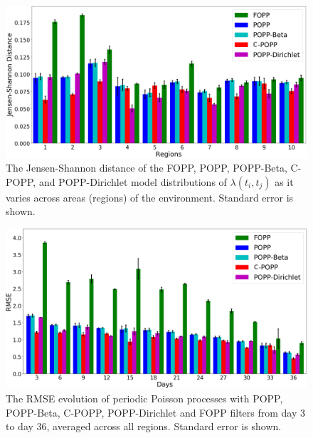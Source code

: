\begin{figure}[t!]
	\centering
	\includegraphics[width=0.95\columnwidth]{./figures/fopp_popp_popb_npop_popd_kl.png}
	\caption{The Jensen-Shannon distance of the FOPP, POPP, POPP-Beta, C-POPP, and POPP-Dirichlet model distributions of $\lambda(t_i, t_j)$ as it varies across areas (regions) of the environment. Standard error is shown.}
	\label{fig:fopp_popp_popb_npop_popd_kl}
\end{figure}

\begin{figure}[t!]
	\centering
	\includegraphics[width=0.95\columnwidth]{./figures/fopp_popp_popb_npop_popd_rmse_evo.png}
	\caption{The RMSE evolution of periodic Poisson processes with POPP, POPP-Beta, C-POPP, POPP-Dirichlet and FOPP filters from day 3 to day 36, averaged across all regions. Standard error is shown.}
	\label{fig:fopp_popp_popb_npop_popd_rmse_evo}
\end{figure}

